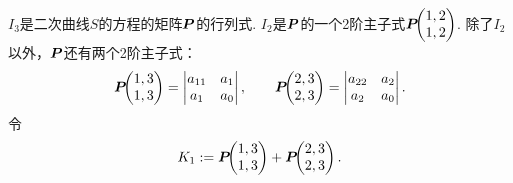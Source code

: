 \(I_3\)是二次曲线\(S\)的方程的矩阵\(\boldsymbol{P}\)的行列式.
\(I_2\)是\(\boldsymbol{P}\)的一个2阶主子式\(\boldsymbol{P}\kern-3.8pt\begin{pmatrix}1,2 \\ 1,2\end{pmatrix}\).
除了\(I_2\)以外，\(\boldsymbol{P}\)还有两个2阶主子式：\begin{equation*}
	\boldsymbol{P}\kern-3.8pt\begin{pmatrix}1,3 \\ 1,3\end{pmatrix}
	= \begin{vmatrix}
		a_{11} & a_1 \\
		a_1 & a_0
	\end{vmatrix},
	\qquad
	\boldsymbol{P}\kern-3.8pt\begin{pmatrix}2,3 \\ 2,3\end{pmatrix}
	= \begin{vmatrix}
		a_{22} & a_2 \\
		a_2 & a_0
	\end{vmatrix}.
\end{equation*}
令\begin{equation*}
	K_1 := \boldsymbol{P}\kern-3.8pt\begin{pmatrix}1,3 \\ 1,3\end{pmatrix} + \boldsymbol{P}\kern-3.8pt\begin{pmatrix}2,3 \\ 2,3\end{pmatrix}.
\end{equation*}

